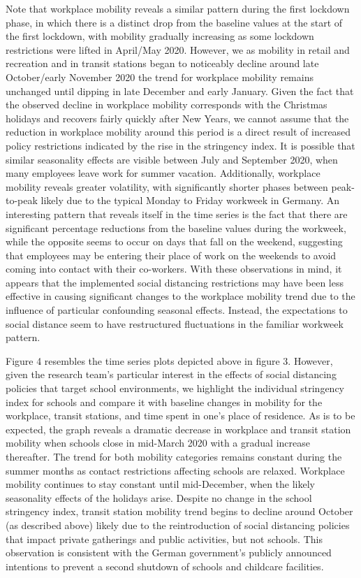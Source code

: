 Note that workplace mobility reveals a similar pattern during the first lockdown phase, in which there is a distinct drop from the baseline values at the start of the first lockdown, with mobility gradually increasing as some lockdown restrictions were lifted in April/May 2020. However, we as mobility in retail and recreation and in transit stations began to noticeably decline around late October/early November 2020 the trend for workplace mobility remains unchanged until dipping in late December and early January. Given the fact that the observed decline in workplace mobility corresponds with the Christmas holidays and recovers fairly quickly after New Years, we cannot assume that the reduction in workplace mobility around this period is a direct result of increased policy restrictions indicated by the rise in the stringency index. It is possible that similar seasonality effects are visible between July and September 2020, when many employees leave work for summer vacation. Additionally, workplace mobility reveals greater volatility, with significantly shorter phases between peak-to-peak likely due to the typical Monday to Friday workweek in Germany. An interesting pattern that reveals itself in the time series is the fact that there are significant percentage reductions from the baseline values during the workweek, while the opposite seems to occur on days that fall on the weekend, suggesting that employees may be entering their place of work on the weekends to avoid coming into contact with their co-workers. With these observations in mind, it appears that the implemented social distancing restrictions may have been less effective in causing significant changes to the workplace mobility trend due to the influence of particular confounding seasonal effects. Instead, the expectations to social distance seem to have restructured fluctuations in the familiar workweek pattern.

Figure 4 resembles the time series plots depicted above in figure 3. However, given the research team’s particular interest in the effects of social distancing policies that target school environments, we highlight the individual stringency index for schools and compare it with baseline changes in mobility for the workplace, transit stations, and time spent in one’s place of residence. As is to be expected, the graph reveals a dramatic decrease in workplace and transit station mobility when schools close in mid-March 2020 with a gradual increase thereafter. The trend for both mobility categories remains constant during the summer months as contact restrictions affecting schools are relaxed. Workplace mobility continues to stay constant until mid-December, when the likely seasonality effects of the holidays arise. Despite no change in the school stringency index, transit station mobility trend begins to decline around October (as described above) likely due to the reintroduction of social distancing policies that impact private gatherings and public activities, but not schools. This observation is consistent with the German government’s publicly announced intentions to prevent a second shutdown of schools and childcare facilities.

